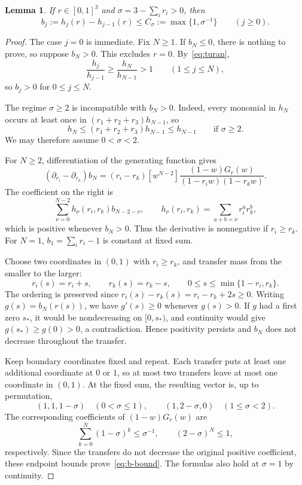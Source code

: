 \documentclass[11pt]{article}
\numberwithin{equation}{section}
\newtheorem{lemma}[theorem]{Lemma}
\begin{document}
\begin{lemma}\label{lem:coefficient-extremum}
If $r\in[0,1]^3$ and $\sigma=3-\sum_i r_i>0$, then
\begin{equation}\label{eq:b-bound}
 b_j:=h_j(r)-h_{j-1}(r)\le C_\sigma:=\max\{1,\sigma^{-1}\}
 \qquad(j\ge0).
\end{equation}
\end{lemma}
\begin{proof}
The case $j=0$ is immediate. Fix $N\ge1$. If $b_N\le0$, there is nothing
to prove, so suppose $b_N>0$. This excludes $r=0$. By~\eqref{eq:turan},
\[
 \frac{h_j}{h_{j-1}}\ge\frac{h_N}{h_{N-1}}>1
 \qquad(1\le j\le N),
\]
so $b_j>0$ for $0\le j\le N$.

The regime $\sigma\ge2$ is incompatible with $b_N>0$. Indeed, every
monomial in $h_N$ occurs at least once in $(r_1+r_2+r_3)h_{N-1}$, so
\[
 h_N\le(r_1+r_2+r_3)h_{N-1}\le h_{N-1}
 \qquad\text{if }\sigma\ge2.
\]
We may therefore assume $0<\sigma<2$.

For $N\ge2$, differentiation of the generating function gives
\[
 (\partial_{r_i}-\partial_{r_k})b_N
 =(r_i-r_k)[w^{N-2}]
 \frac{(1-w)G_r(w)}{(1-r_iw)(1-r_kw)}.
\]
The coefficient on the right is
\[
 \sum_{\nu=0}^{N-2}h_\nu(r_i,r_k)b_{N-2-\nu},
 \qquad h_\nu(r_i,r_k)=\sum_{a+b=\nu}r_i^a r_k^b,
\]
which is positive whenever $b_N>0$. Thus the derivative is nonnegative
if $r_i\ge r_k$. For $N=1$, $b_1=\sum_i r_i-1$ is constant at fixed sum.

Choose two coordinates in $(0,1)$ with $r_i\ge r_k$, and transfer mass
from the smaller to the larger:
\[
 r_i(s)=r_i+s,\qquad r_k(s)=r_k-s,\qquad
 0\le s\le\min\{1-r_i,r_k\}.
\]
The ordering is preserved since $r_i(s)-r_k(s)=r_i-r_k+2s\ge0$.
Writing $g(s)=b_N(r(s))$, we have $g'(s)\ge0$ whenever $g(s)>0$.
If $g$ had a first zero $s_*$, it would be nondecreasing on $[0,s_*)$,
and continuity would give $g(s_*)\ge g(0)>0$, a contradiction. Hence
positivity persists and $b_N$ does not decrease throughout the transfer.

Keep boundary coordinates fixed and repeat. Each transfer puts at least
one additional coordinate at $0$ or $1$, so at most two transfers leave
at most one coordinate in $(0,1)$. At the fixed sum, the resulting vector
is, up to permutation,
\[
 (1,1,1-\sigma)\quad(0<\sigma\le1),\qquad
 (1,2-\sigma,0)\quad(1\le\sigma<2).
\]
The corresponding coefficients of $(1-w)G_r(w)$ are
\[
 \sum_{k=0}^N(1-\sigma)^k\le\sigma^{-1},\qquad
 (2-\sigma)^N\le1,
\]
respectively. Since the transfers do not decrease the original positive
coefficient, these endpoint bounds prove~\eqref{eq:b-bound}. The formulas
also hold at $\sigma=1$ by continuity.
\end{proof}
\end{document}
